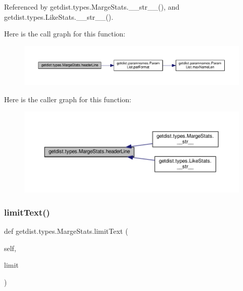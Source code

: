 Referenced by getdist.\+types.\+Marge\+Stats.\+\_\+\+\_\+str\+\_\+\+\_\+(), and getdist.\+types.\+Like\+Stats.\+\_\+\+\_\+str\+\_\+\+\_\+().

Here is the call graph for this function\+:
\nopagebreak
\begin{figure}[H]
\begin{center}
\leavevmode
\includegraphics[width=350pt]{classgetdist_1_1types_1_1MargeStats_a2ddab13aed8fe2159f0a4d742bdad5c9_cgraph}
\end{center}
\end{figure}
Here is the caller graph for this function\+:
\nopagebreak
\begin{figure}[H]
\begin{center}
\leavevmode
\includegraphics[width=350pt]{classgetdist_1_1types_1_1MargeStats_a2ddab13aed8fe2159f0a4d742bdad5c9_icgraph}
\end{center}
\end{figure}
\mbox{\label{classgetdist_1_1types_1_1MargeStats_a08ede992eb83354249dfd689e1f3d9bf}} 
\subsubsection{\texorpdfstring{limit\+Text()}{limitText()}}
{\footnotesize\ttfamily def getdist.\+types.\+Marge\+Stats.\+limit\+Text (\begin{DoxyParamCaption}\item[{}]{self,  }\item[{}]{limit }\end{DoxyParamCaption})}



